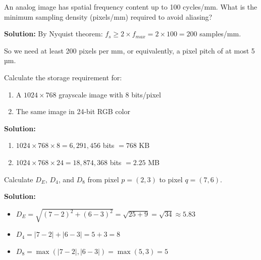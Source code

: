 \documentclass[12pt,a4paper]{article}
\begin{document}
\begin{examplebox}
An analog image has spatial frequency content up to 100 cycles/mm. What is the minimum sampling density (pixels/mm) required to avoid aliasing?

\textbf{Solution:}
By Nyquist theorem: $f_s \geq 2 \times f_{max} = 2 \times 100 = 200$ samples/mm.

So we need at least 200 pixels per mm, or equivalently, a pixel pitch of at most 5 µm.
\end{examplebox}

\begin{examplebox}
Calculate the storage requirement for:
\begin{enumerate}
    \item A $1024 \times 768$ grayscale image with 8 bits/pixel
    \item The same image in 24-bit RGB color
\end{enumerate}

\textbf{Solution:}
\begin{enumerate}
    \item $1024 \times 768 \times 8 = 6,291,456$ bits $= 768$ KB
    \item $1024 \times 768 \times 24 = 18,874,368$ bits $= 2.25$ MB
\end{enumerate}
\end{examplebox}

\begin{examplebox}
Calculate $D_E$, $D_4$, and $D_8$ from pixel $p = (2, 3)$ to pixel $q = (7, 6)$.

\textbf{Solution:}
\begin{itemize}
    \item $D_E = \sqrt{(7-2)^2 + (6-3)^2} = \sqrt{25 + 9} = \sqrt{34} \approx 5.83$
    \item $D_4 = |7-2| + |6-3| = 5 + 3 = 8$
    \item $D_8 = \max(|7-2|, |6-3|) = \max(5, 3) = 5$
\end{itemize}
\end{examplebox}
\end{document}
